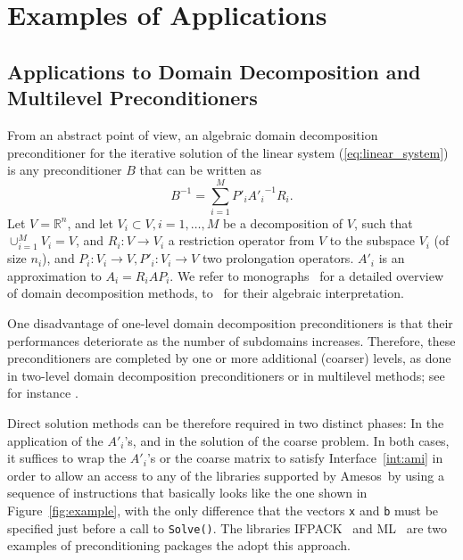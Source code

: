 \documentclass[acmtocl]{acmtrans2m}
\newcommand{\amesos}{{\sc Amesos}}
\begin{document}
\section{Examples of Applications}
\label{sec:example}

\subsection{Applications to Domain Decomposition and Multilevel Preconditioners}
\label{sec:preconditioner}

From an abstract point of view, an algebraic domain decomposition
preconditioner for the iterative solution of the linear system
(\ref{eq:linear_system})
is any preconditioner $B$ that can be written as
\begin{equation}
\label{eq:prec}
B^{-1} = \sum_{i=1}^M P'_i {A'_i}^{-1} R_i.
\end{equation}
Let $V = \mathbb{R}^n$, and
let $V_i \subset V, i = 1, \ldots, M$ be a decomposition of $V$, such that
$\cup_{i=1}^M V_i = V$, and $R_i: V \rightarrow V_i$ a restriction operator
from $V$ to the subspace $V_i$ (of size $n_i$),
and $P_i: V_i \rightarrow V, P'_i : V_i \rightarrow V$ two prolongation
operators. $A'_i$ is an approximation to $A_i = R_i A P_i$.  We refer to 
monographs~\cite{QV2,smith96parallel} for a detailed
overview of domain decomposition methods, to~\cite{saad96iterative} for their
algebraic interpretation.

One disadvantage of one-level domain decomposition preconditioners is that
their performances deteriorate as the number of subdomains increases.
Therefore, these preconditioners are completed by one or more additional
(coarser) levels, as done in two-level domain decomposition preconditioners or
in multilevel methods; 
see for instance \cite{brandt.classic,hack.book,hack2.book}. 

Direct solution methods can be therefore required in two distinct phases: In the application of
the $A'_i$'s, and in the solution of the coarse problem. In both cases, it
suffices to wrap the $A'_i$'s or the coarse matrix to satisfy
Interface~\ref{int:ami} in order to allow an access to any of the libraries
supported by \amesos\ by using a sequence of instructions that basically looks
like the one shown in Figure~\ref{fig:example}, with the only difference that
the vectors \verb!x! and \verb!b! must be specified just before a call to
\verb!Solve()!.  The libraries IFPACK~\cite{ifpack-guide} and
ML~\cite{ml-guide} are two examples of preconditioning packages the adopt this
approach.
\end{document}
